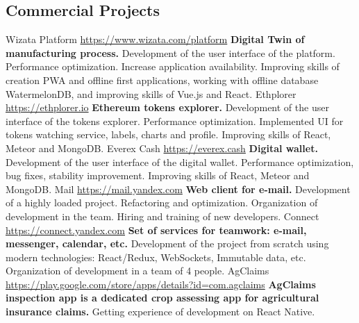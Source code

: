 \documentclass[11pt,a4paper]{moderncv}
\begin{document}
  \subsection{Commercial Projects}
  \cvline
    {Wizata Platform}
    {\url{https://www.wizata.com/platform}\newline{}
    \textbf{Digital Twin of manufacturing process.}\newline{}
    Development of the user interface of the platform. Performance optimization. Increase application availability.\newline{}
    Improving skills of creation PWA and offline first applications, working with offline database WatermelonDB, and improving skills of Vue.js and React.}
  \cvline
    {Ethplorer}
    {\url{https://ethplorer.io}\newline{}
    \textbf{Ethereum tokens explorer.}\newline{}
    Development of the user interface of the tokens explorer. Performance optimization. Implemented UI for tokens watching service, labels, charts and profile.\newline{}
    Improving skills of React, Meteor and MongoDB.}
  \cvline
    {Everex Cash}
    {\url{https://everex.cash}\newline{}
    \textbf{Digital wallet.}\newline{}
    Development of the user interface of the digital wallet. Performance optimization, bug fixes, stability improvement.\newline{}
    Improving skills of React, Meteor and MongoDB.}
  \cvline
    {Mail}
    {\url{https://mail.yandex.com}\newline{}
    \textbf{Web client for e-mail.}\newline{}
    Development of a highly loaded project. Refactoring and optimization.\newline{}
    Organization of development in the team. Hiring and training of new developers.}
  \cvline
    {Connect}
    {\url{https://connect.yandex.com}\newline{}
    \textbf{Set of services for teamwork: e-mail, messenger, calendar, etc.}\newline{}
    Development of the project from scratch using modern technologies:
    React/Redux, WebSockets, Immutable data, etc.
    Organization of development in a team of 4 people.}
  \cvline
    {AgClaims}
    {\url{https://play.google.com/store/apps/details?id=com.agclaims}\newline{}
    \textbf{AgClaims inspection app is a dedicated crop assessing app for agricultural insurance claims.}\newline{}
    Getting experience of development on React Native.}
\end{document}
